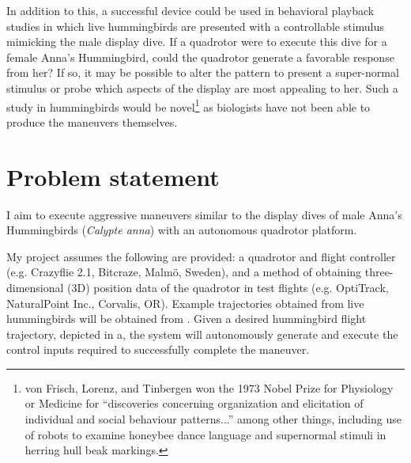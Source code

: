 \documentclass[onecolumn,10pt]{IEEEtran}
\newcommand{\Calypteanna}{\emph{Calypte anna}}
\begin{document}
In addition to this, a successful device could be used in behavioral playback studies in which live hummingbirds are presented with a controllable stimulus mimicking the male display dive.  If a quadrotor were to execute this dive for a female Anna's Hummingbird, could the quadrotor generate a favorable response from her? If so, it may be possible to alter the pattern to present a super-normal stimulus or probe which aspects of the display are most appealing to her.  Such a study in hummingbirds would be novel\footnote{von Frisch, Lorenz, and Tinbergen won the 1973 Nobel Prize for Physiology or Medicine for ``discoveries concerning organization and elicitation of individual and social behaviour patterns...'' among other things, including use of robots to examine honeybee dance language and supernormal stimuli in herring hull beak markings.}  as biologists have not been able to produce the maneuvers themselves.






\section{Problem statement}
I aim to execute aggressive maneuvers similar to the display dives of male Anna’s Hummingbirds (\Calypteanna) with an autonomous quadrotor platform. 

My project assumes the following are provided: a quadrotor and  flight controller (e.g. Crazyflie 2.1, Bitcraze, Malm\"{o}, Sweden), and a method of obtaining three-dimensional (3D) position data of the quadrotor in test flights (e.g. OptiTrack, NaturalPoint Inc., Corvalis, OR). Example trajectories obtained from live hummingbirds will be obtained from \cite{clark2009courtship}.  Given a desired hummingbird flight trajectory, depicted in a, the system will autonomously generate and execute the control inputs required to successfully complete the maneuver. 
\end{document}

